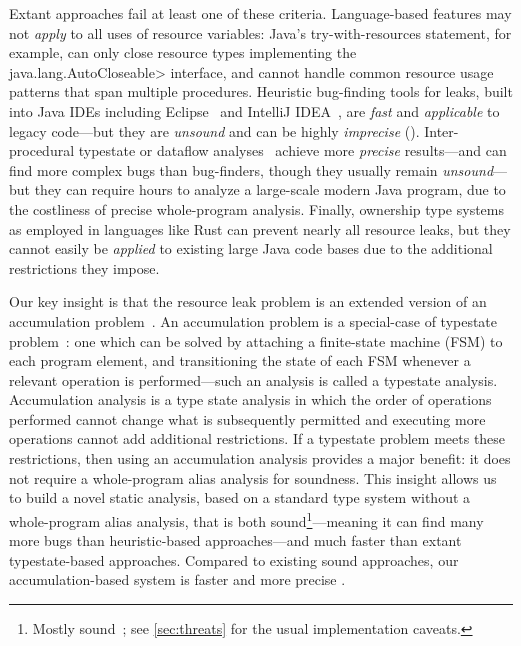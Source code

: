 Extant approaches fail at least one of these criteria.
Language-based features may not \emph{apply} to all uses of resource variables:
Java's try-with-resources statement, for example, can
only close resource types implementing the \<java.lang.AutoCloseable> interface,
and cannot handle
common resource usage patterns that span multiple procedures.
Heuristic bug-finding tools for leaks, built into Java IDEs including
Eclipse~\cite{ecj-resource-leak} and IntelliJ
IDEA~\cite{idea-resource-leak}, 
are \emph{fast} and \emph{applicable} to legacy
code---but they are \emph{unsound} and can be highly \emph{imprecise}
().  
Inter-procedural typestate or dataflow analyses~\cite{TorlakC10,zuo2019grapple}
achieve more \emph{precise}
results---and
can find more complex bugs than bug-finders, though they usually remain
\emph{unsound}---but
they can require hours to analyze a large-scale modern Java program, due
to the costliness of precise whole-program analysis.    Finally, ownership type
systems~\cite{clarke2013ownership} as employed in languages like Rust
 can prevent nearly all resource leaks, but they cannot easily be
\emph{applied} to existing large Java code bases due to the additional restrictions
they impose.

Our key insight is that the resource leak problem is an extended
version of an accumulation problem~\cite{KelloggRSSE2020}. An
accumulation problem is a special-case of typestate problem~\cite{StromY86}:
one which can be solved by attaching a finite-state machine (FSM)
to each program element, and transitioning the state of each
FSM whenever a relevant operation is performed---such an analysis
is called a typestate analysis.
Accumulation analysis is a type state analysis in which
the order of operations performed cannot change what is subsequently
permitted and executing more operations cannot add additional
restrictions.  If a typestate problem meets these restrictions, then
using an accumulation analysis provides a major benefit: it does not
require a whole-program alias analysis for soundness.
This insight allows
us to build a novel static analysis, based on a standard type system
without a whole-program alias analysis, that is both sound\footnote{Mostly
  sound~\cite{livshits2015defense}; see
\cref{sec:threats} for the usual implementation caveats.}---meaning it
can find many more bugs than heuristic-based approaches---and much
faster than extant typestate-based approaches.  Compared to existing
sound approaches, our accumulation-based system is faster and more
precise .


